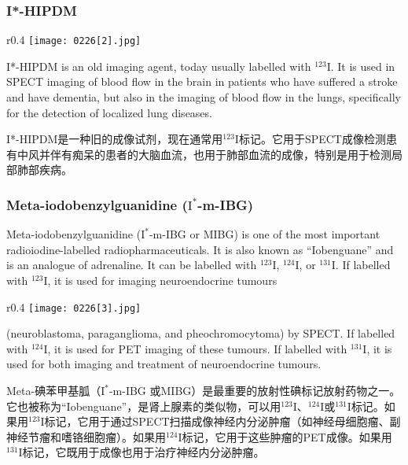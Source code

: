 \documentclass[dvipsnames, svgnames,a4paper,11pt]{article}
\begin{document}
\subsubsection{I*-HIPDM}  
\begin{wrapfigure}{r}{0.4\textwidth}
    \centering
    \texttt{[image: 0226[2].jpg]}
     \label{fig298}
\end{wrapfigure}

I*-HIPDM is an old imaging agent, today usually labelled with \(\mathrm{^{123}I}\). It is used in SPECT imaging of blood flow in the brain in patients who have suffered a stroke and have dementia, but also in the imaging of blood flow in the lungs, specifically for the detection of localized lung diseases.

I*-HIPDM是一种旧的成像试剂，现在通常用\(\mathrm{^{123}I}\)标记。它用于SPECT成像检测患有中风并伴有痴呆的患者的大脑血流，也用于肺部血流的成像，特别是用于检测局部肺部疾病。

\subsubsection{Meta-iodobenzylguanidine (\(\mathrm{I^{*}}\)-m-IBG)}  
Meta-iodobenzylguanidine (\(\mathrm{I^{*}}\)-m-IBG or MIBG) is one of the most important radioiodine-labelled radiopharmaceuticals. It is also known as “Iobenguane” and is an analogue of adrenaline. It can be labelled with \(\mathrm{^{123}I}\), \(\mathrm{^{124}I}\), or \(\mathrm{^{131}I}\).
If labelled with \(\mathrm{^{123}I}\), it is used for imaging 
neuroendocrine tumours
\setcounter{figure}{299}
\begin{wrapfigure}{r}{0.4\textwidth}
    \centering
    \texttt{[image: 0226[3].jpg]}
     \label{fig299}
\end{wrapfigure}
(neuroblastoma, paraganglioma, and pheochromocytoma) by SPECT. If labelled with \(\mathrm{^{124}I}\), it is used for PET imaging of these tumours. If labelled with \(\mathrm{^{131}I}\), it is used for both imaging and treatment of neuroendocrine tumours.



Meta-碘苯甲基胍（\(\mathrm{I^{*}}\)-m-IBG 或MIBG）是最重要的放射性碘标记放射药物之一。它也被称为“Iobenguane”，是肾上腺素的类似物，可以用\(\mathrm{^{123}I}\)、\(\mathrm{^{124}I}\)或\(\mathrm{^{131}I}\)标记。如果用\(\mathrm{^{123}I}\)标记，它用于通过SPECT扫描成像神经内分泌肿瘤（如神经母细胞瘤、副神经节瘤和嗜铬细胞瘤）。如果用\(\mathrm{^{124}I}\)标记，它用于这些肿瘤的PET成像。如果用\(\mathrm{^{131}I}\)标记，它既用于成像也用于治疗神经内分泌肿瘤。
\end{document}
